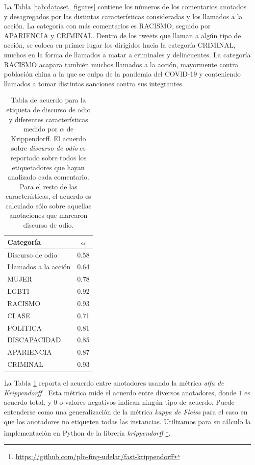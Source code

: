La Tabla \ref{tab:dataset_figures} contiene los números de los comentarios anotados y desagregados por las distintas características consideradas y los llamados a la acción. La categoría con más comentarios es RACISMO, seguido por APARIENCIA y CRIMINAL. Dentro de los tweets que llaman a algún tipo de acción, se coloca en primer lugar los dirigidos hacia la categoría CRIMINAL, muchos en la forma de llamados a matar a criminales y delincuentes. La categoría RACISMO acapara también muchos llamados a la acción, mayormente contra población china a la que se culpa de la pandemia del COVID-19 y conteniendo llamados a tomar distintas sanciones contra sus integrantes.


\begin{table}
    \centering
    \begin{tabular}{lc}
        \toprule
        Categoría   & $\alpha$  \\
        \midrule
        Discurso de odio     &  \num{0.58} \\
        Llamados a la acción &  \num{0.64} \\
        \hline
        MUJER                &  \num{0.78} \\
        LGBTI                &  \num{0.92} \\
        RACISMO              &  \num{0.93} \\
        CLASE                &  \num{0.71} \\
        POLITICA             &  \num{0.81} \\
        DISCAPACIDAD         &  \num{0.85} \\
        APARIENCIA           &  \num{0.87} \\
        CRIMINAL             &  \num{0.93} \\
        \bottomrule
    \end{tabular}
    \caption{Tabla de acuerdo para la etiqueta de discurso de odio y diferentes características medido por $\alpha$ de Krippendorff. El acuerdo sobre \emph{discurso de odio} es reportado sobre todos los etiquetadores que hayan analizado cada comentario. Para el resto de las características, el acuerdo es calculado sólo sobre aquellas anotaciones que marcaron discurso de odio.}
    \label{tab:annotation_agreement}
\end{table}

La Tabla \ref{tab:annotation_agreement} reporta el acuerdo entre anotadores usando la métrica \emph{alfa de Krippendorff} \cite{krippendorff2018content}. Esta métrica mide el acuerdo entre diversos anotadores, donde $1$ es acuerdo total, y 0 o valores negativos indican ningún tipo de acuerdo. Puede entenderse como una generalización de la métrica \emph{kappa de Fleiss} para el caso en que los anotadores no etiqueten todas las instancias. Utilizamos para su cálculo la implementación en Python de la librería \emph{krippendorff} \footnote{\url{https://github.com/pln-fing-udelar/fast-krippendorff}}.

